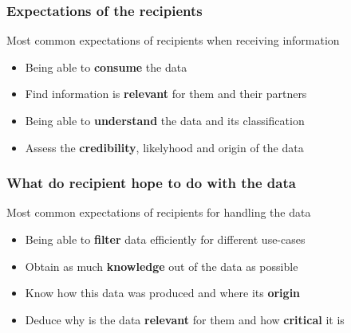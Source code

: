 \begin{frame}
    \frametitle{Expectations of the recipients}
    Most common expectations of recipients when receiving information

    \begin{itemize}
        \item Being able to \textbf{consume} the data
        \item Find information is \textbf{relevant} for them and their partners
        \item Being able to \textbf{understand} the data and its classification
        \item Assess the \textbf{credibility}, likelyhood and origin of the data
    \end{itemize}

\end{frame}

\begin{frame}
    \frametitle{What do recipient hope to do with the data}
    Most common expectations of recipients for handling the data\\

    \begin{itemize}
        \item Being able to \textbf{filter} data efficiently for different use-cases
        \item Obtain as much \textbf{knowledge} out of the data as possible
        \item Know how this data was produced and where its \textbf{origin}
        \item Deduce why is the data \textbf{relevant} for them and how \textbf{critical} it is
    \end{itemize}
\end{frame}

